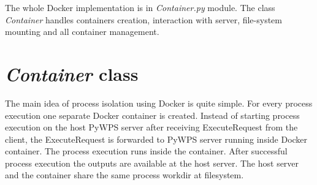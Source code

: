 \begin{figure}[h!]
\centering
\begin{floatrow}
\end{floatrow}
\end{figure}

\bigskip
The whole Docker implementation is in \textit{Container.py} module. The class \textit{Container} handles containers creation, interaction with
server, file-system mounting and all container management.

\newpage
\section{\textit{Container} class}
The main idea of process isolation using Docker is quite simple. For every process execution one separate Docker container is created.
Instead of starting process execution on the host PyWPS server after receiving ExecuteRequest from the client, the ExecuteRequest is
forwarded to PyWPS server running inside Docker container. The process execution runs inside the container. After successful process
execution the outputs are available at the host server. The host server and the container share the same process workdir at filesystem.


